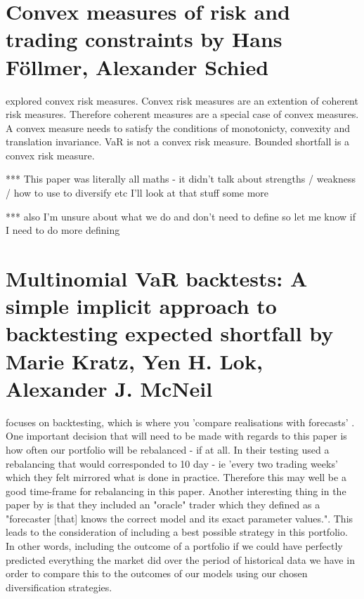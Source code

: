 \documentclass[12pt,a4paper]{article}
\begin{document}
\citep{BRANDTNER20135526}

\section{Convex measures of risk and trading constraints by Hans F{\"o}llmer, Alexander Schied}
\label{sec:2}

\cite{Föllmer2002} explored convex risk measures. Convex risk measures are an extention of coherent risk measures. Therefore coherent measures are a special case of convex measures. A convex measure needs to satisfy the conditions of monotonicty, convexity and translation invariance.  VaR is not a convex risk measure. Bounded shortfall is a convex risk measure.

*** This paper was literally all maths - it didn't talk about strengths / weakness / how to use to diversify etc I'll look at that stuff some more

*** also I'm unsure about what we do and don't need to define so let me know if I need to do more defining

\section{Multinomial VaR backtests: A simple implicit approach to backtesting expected shortfall by Marie Kratz, Yen H. Lok, Alexander J. McNeil}
\label{sec:3}

\cite{KRATZ2018393} focuses on backtesting, which is where you 'compare realisations with forecasts' \citep{KRATZ2018393}. One important decision that will need to be made with regards to this paper is how often our portfolio will be rebalanced - if at all. In their testing\cite{KRATZ2018393} used a rebalancing that would corresponded to 10 day - ie 'every two trading weeks' which they felt mirrored what is done in practice. Therefore this may well be a good time-frame for rebalancing in this paper. Another interesting thing in the paper by \cite{KRATZ2018393} is that they included an "oracle" trader which they defined as a "forecaster [that] knows the correct model and its exact parameter values.". This leads to the consideration of including a best possible strategy in this portfolio. In other words, including the outcome of a portfolio if we could have perfectly predicted everything the market did over the period of historical data we have in order to compare this to the outcomes of our models using our chosen diversification strategies.   
\end{document}
